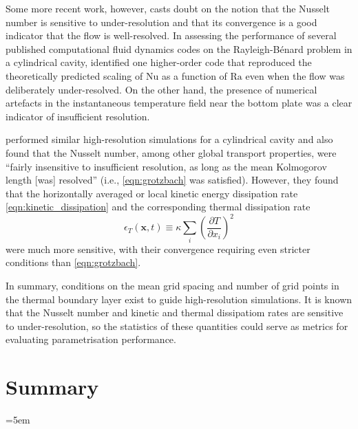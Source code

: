 \documentclass[titlepage,twoside]{article}
\numberwithin{equation}{section}
\newcommand{\pdiff}[2]{\frac{\partial #1}{\partial #2}}
\renewcommand\vec{\bm}
\newcommand{\rayleigh}{\ensuremath{\mathrm{Ra}}}
\newcommand{\nusselt}{\ensuremath{\mathrm{Nu}}}
\newcommand{\rb}{Rayleigh-B\'{e}nard}
\begin{document}
Some more recent work, however, casts doubt on the notion that the Nusselt
number is sensitive to under-resolution and that its convergence is a good
indicator that the flow is well-resolved. In assessing the performance of
several published computational fluid dynamics codes on the \rb{} problem in a
cylindrical cavity, \textcite{kooij2018} identified one higher-order code that
reproduced the theoretically predicted scaling of $\nusselt$ as a function of
$\rayleigh$ even when the flow was deliberately under-resolved. On the other
hand, the presence of numerical artefacts in the instantaneous temperature
field near the bottom plate was a clear indicator of insufficient resolution.


\textcite{scheel2013} performed similar high-resolution simulations for
a cylindrical cavity and also found that the Nusselt number, among other
global transport properties, were ``fairly insensitive to insufficient
resolution, as long as the mean Kolmogorov length [was] resolved'' (i.e.,
\cref{eqn:grotzbach} was satisfied). However, they found that the horizontally
averaged or local kinetic energy dissipation rate
\cref{eqn:kinetic_dissipation} and the corresponding thermal dissipation rate
\begin{equation}
    \label{eqn:thermal_dissipation}
    \epsilon_T(\vec{x}, t) \equiv \kappa \sum_i \left(\pdiff{T}{x_i}\right)^2
\end{equation}
were much more sensitive, with their convergence requiring even stricter
conditions than \cref{eqn:grotzbach}.

In summary, conditions on the mean grid spacing and number of grid points in the thermal boundary layer exist to guide high-resolution simulations. It is known that the Nusselt number and kinetic and thermal dissipatiom rates are sensitive to under-resolution, so the statistics of these quantities could serve as metrics for evaluating parametrisation performance.


\clearpage
\section{Summary}

\clearpage
\emergencystretch=5em
\printbibliography
\end{document}
